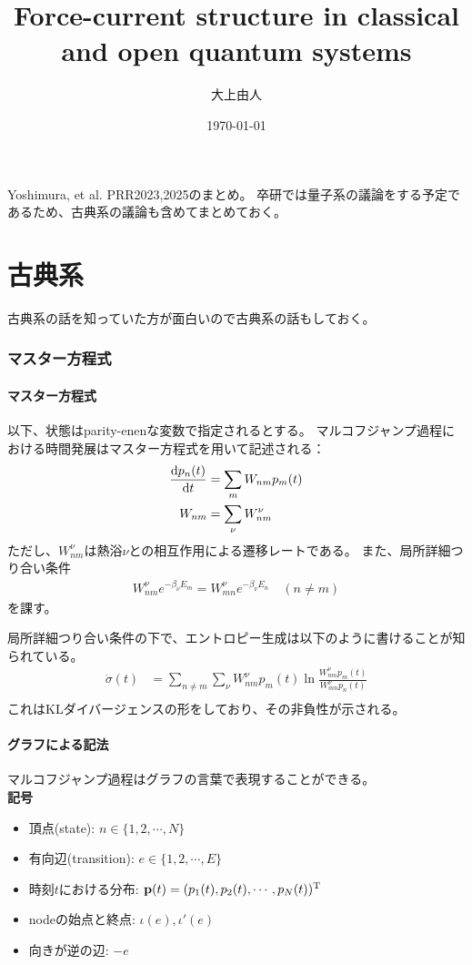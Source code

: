 \documentclass[a4paper,11pt]{jsarticle}
\numberwithin{equation}{section}
\begin{document}
\title{Force-current structure in classical and open quantum systems}
\author{大上由人}
\date{\today}
\maketitle

Yoshimura, et al. PRR2023,2025のまとめ。
卒研では量子系の議論をする予定であるため、古典系の議論も含めてまとめておく。

\part{古典系}
古典系の話を知っていた方が面白いので古典系の話もしておく。
\section{マスター方程式}
\subsection{マスター方程式}
以下、状態はparity-enenな変数で指定されるとする。
マルコフジャンプ過程における時間発展はマスター方程式を用いて記述される：
\begin{align}
    \dv{p_{n}(t)}{t} &= \sum_{m} W_{nm} p_{m}(t) \\
    W_{nm} &= \sum_{\nu} W_{nm}^{\nu} 
\end{align}
ただし、$W_{nm}^{\nu}$は熱浴$\nu$との相互作用による遷移レートである。
また、局所詳細つり合い条件
\begin{align}
    W_{nm}^{\nu} e^{-\beta_{\nu}E_{m}} = W_{mn}^{\nu} e^{-\beta_{\nu}E_{n}} \quad (n \neq m)
\end{align}
を課す。

局所詳細つり合い条件の下で、エントロピー生成は以下のように書けることが知られている。
\begin{align}
    \dot{\sigma}(t) &= \sum_{n\neq m} \sum_{\nu} W_{nm}^{\nu}p_{m}(t) \ln \frac{W_{nm}^{\nu}p_{m}(t)}{W_{mn}^{\nu}p_{n}(t)} \\
\end{align}
これはKLダイバージェンスの形をしており、その非負性が示される。

\subsection{グラフによる記法}
マルコフジャンプ過程はグラフの言葉で表現することができる。\\
\textbf{記号}
\begin{itemize}
    \item 頂点(state): $n \in \{1,2,\cdots,N\}$
    \item 有向辺(transition): $e \in \{1,2,\cdots,E\}$
    \item 時刻$t$における分布: $\vb{p}(t) = (p_1(t),p_2(t),\cdots,p_N(t))^{\mathrm{T}}$
    \item nodeの始点と終点: $\iota(e),\iota'(e)$
    \item 向きが逆の辺: $-e$
\end{itemize}
\end{document}
